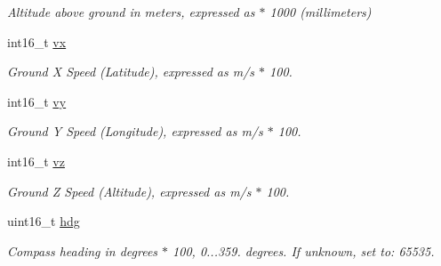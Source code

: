 \begin{DoxyCompactItemize}
\begin{DoxyCompactList}\small\item\em Altitude above ground in meters, expressed as $\ast$ 1000 (millimeters) \end{DoxyCompactList}\item 
\hypertarget{struct____mavlink__global__position__int__t_a1f2bef1206e578e3f0f85f7854621829}{int16\+\_\+t \hyperlink{struct____mavlink__global__position__int__t_a1f2bef1206e578e3f0f85f7854621829}{vx}}\label{struct____mavlink__global__position__int__t_a1f2bef1206e578e3f0f85f7854621829}

\begin{DoxyCompactList}\small\item\em Ground X Speed (Latitude), expressed as m/s $\ast$ 100. \end{DoxyCompactList}\item 
\hypertarget{struct____mavlink__global__position__int__t_a89734a8b924f059f9e634233ce021cd3}{int16\+\_\+t \hyperlink{struct____mavlink__global__position__int__t_a89734a8b924f059f9e634233ce021cd3}{vy}}\label{struct____mavlink__global__position__int__t_a89734a8b924f059f9e634233ce021cd3}

\begin{DoxyCompactList}\small\item\em Ground Y Speed (Longitude), expressed as m/s $\ast$ 100. \end{DoxyCompactList}\item 
\hypertarget{struct____mavlink__global__position__int__t_ac476cea996cb642f139a93fc7f5ed2a4}{int16\+\_\+t \hyperlink{struct____mavlink__global__position__int__t_ac476cea996cb642f139a93fc7f5ed2a4}{vz}}\label{struct____mavlink__global__position__int__t_ac476cea996cb642f139a93fc7f5ed2a4}

\begin{DoxyCompactList}\small\item\em Ground Z Speed (Altitude), expressed as m/s $\ast$ 100. \end{DoxyCompactList}\item 
uint16\+\_\+t \hyperlink{struct____mavlink__global__position__int__t_a60f7c02018c444cdffb6121dee854e19}{hdg}
\begin{DoxyCompactList}\small\item\em Compass heading in degrees $\ast$ 100, 0...359. degrees. If unknown, set to\+: 65535. \end{DoxyCompactList}\end{DoxyCompactItemize}


